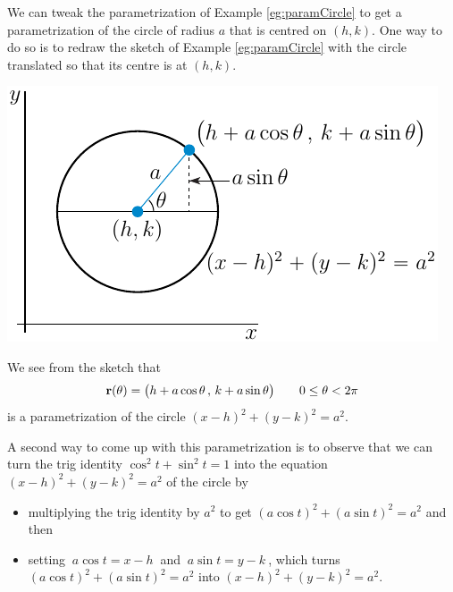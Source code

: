 \begin{eg}[Parametrization of  $(x-h)^2+(y-k)^2=a^2$]\label{eg:paramCircleB}
We can tweak the parametrization of Example \ref{eg:paramCircle} to get
a parametrization of the circle of radius $a$ that is centred on $(h,k)$.
One way to do so is to redraw the sketch of Example \ref{eg:paramCircle}
with the circle translated so that its centre is at $(h,k)$.
\begin{efig}
\begin{center}
     \includegraphics{parCirclehk.pdf}
\end{center}
\end{efig}
We see from the sketch that 
\begin{equation*}
\mathbf{r}(\theta) = \big(h+a\cos\theta\,,\,k+a\sin\theta\big)\qquad
0\le \theta< 2\pi
\end{equation*}
is a parametrization of the circle $(x-h)^2+(y-k)^2=a^2$.

A second way to come up with this parametrization is to observe that 
we can turn the trig identity $\cos^2 t + \sin^2 t=1$ into 
the equation $(x-h)^2+(y-k)^2=a^2$ of the circle by
\begin{itemize}
\item
multiplying the trig identity by $a^2$ to get
$(a\cos t)^2 +(a\sin t)^2 =a^2$ and then
\item
setting $\ a\cos t=x-h\ $ and $\ a\sin t=y-k\ $, which turns  $(a\cos t)^2 +(a\sin t)^2 =a^2$ into $(x-h)^2+(y-k)^2=a^2$.
\end{itemize}
\end{eg}

